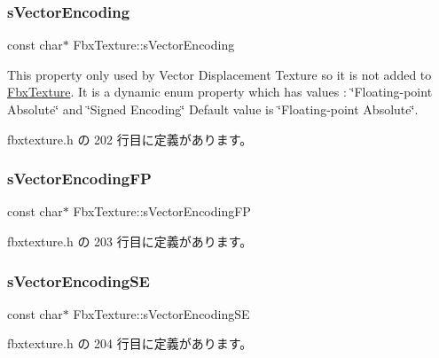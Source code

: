 \subsubsection{\texorpdfstring{s\+Vector\+Encoding}{sVectorEncoding}}
{\footnotesize\ttfamily const char$\ast$ Fbx\+Texture\+::s\+Vector\+Encoding\hspace{0.3cm}{\ttfamily [static]}}

This property only used by Vector Displacement Texture so it is not added to \hyperlink{class_fbx_texture}{Fbx\+Texture}. It is a dynamic enum property which has values \+: \char`\"{}\+Floating-\/point Absolute\char`\"{} and \char`\"{}\+Signed Encoding\char`\"{} Default value is \char`\"{}\+Floating-\/point Absolute\char`\"{}. 

 fbxtexture.\+h の 202 行目に定義があります。

\mbox{\label{class_fbx_texture_a5cd9b07db0e8ee5792511c50626f442b}} 
\subsubsection{\texorpdfstring{s\+Vector\+Encoding\+FP}{sVectorEncodingFP}}
{\footnotesize\ttfamily const char$\ast$ Fbx\+Texture\+::s\+Vector\+Encoding\+FP\hspace{0.3cm}{\ttfamily [static]}}



 fbxtexture.\+h の 203 行目に定義があります。

\mbox{\label{class_fbx_texture_a4f12c4756b837abd121c25662bd61009}} 
\subsubsection{\texorpdfstring{s\+Vector\+Encoding\+SE}{sVectorEncodingSE}}
{\footnotesize\ttfamily const char$\ast$ Fbx\+Texture\+::s\+Vector\+Encoding\+SE\hspace{0.3cm}{\ttfamily [static]}}



 fbxtexture.\+h の 204 行目に定義があります。

